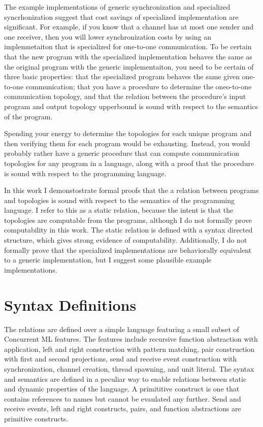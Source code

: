 \documentclass{article}
\begin{document}
The example implementations of generic synchronization and specialized syncrhonization suggest
that cost savings of specialized implementation are significant.  For example, if you know that
a channel has at most one sender and one receiver, then you will lower synchronization costs by
using an implemnetaiton that is specialized for one-to-one communication.  To be certain that
the new program with the specialized implementation behaves the same as the original program
with the generic implementaiton, you need to be certain of three basic properties: that the
specialized program behaves the same given one-to-one communication; that you have a procedure
to determine the oneo-to-one communication topology, and that the relation between the
procedure's input program and output topology upperbound is sound with respect to the semantics
of the program.  

Spending your energy to determine the topologies for each unique program and then verifying
them for each program would be exhausting. Instead, you would probably rather have a generic
procedure that can compute communication topologies for any program in a language, along with
a proof that the procedure is sound with respect to the programming language.

In this work I demonstostrate formal proofs that the a relation between programs and topologies
is sound with respect to the semantics of the programming language.  I refer to this as a
static relation, because the intent is that the topologies are computable from the programs,
although I do not formally prove computability in this work.  The static relation is defined
with a syntax directed structure, which gives strong evidence of computability.  Additionally,
I do not formally prove that the specialized implementations are behaviorally equivalent to a
generic implementation, but I suggest some plausible example implementations.

\section{Syntax Definitions}
The relations are defined over a simple language featuring a small subset of Concurrent ML
features. The features include recursive function abstraction with application, left and right
construction with pattern matching, pair construction with first and second projections, send
and receive event construction with synchronization, channel creation, thread spawning, and
unit literal.  The syntax and semantics are defined in a peculiar way to enable relations
between static and dynamic properties of the language.  A primititive construct is one that
contains references to names but cannot be evaulated any further. Send and receive events,
left and right constructs, pairs, and function abstractions are primitive constructs.
\end{document}
